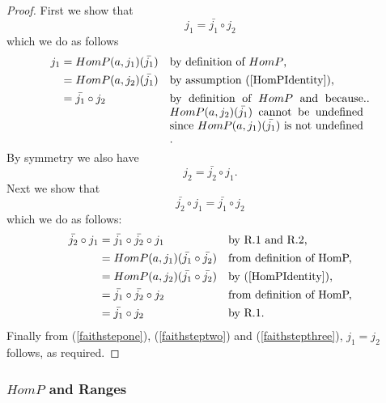 \begin{proof} 
First we show that 
\begin{equation}
\label{faithstepone}
j_1 = \bar{j_1} \circ j_2
\end{equation}
which we do as follows
\begin{align*}
j_1 &= HomP(a,j_1)(\bar{j_1}) &&\mbox{by definition of $HomP$, } \\
   &= HomP(a,j_2)(\bar{j_1}) &&\mbox{by assumption (\ref{HomPIdentity}), } \\
   &= \bar{j_1} \circ j_2    
                     &&\mbox{\parbox[t]{6cm}{by definition 
                                        of $HomP$ and because
                                        $HomP(a,j_2)(\bar{j_1})$ 
                                        cannot be undefined since
                                         $HomP(a,j_1)(\bar{j_1})$
                                         is not undefined . }..} 
  \end{align*}
By symmetry we also have
\begin{equation}
\label{faithsteptwo}
j_2 = \bar{j_2} \circ j_1.
\end{equation}
Next we show that
\begin{equation}
\label{faithstepthree}
\bar{j_2} \circ j_1 = \bar{j_1} \circ j_2
\end{equation}
which we do as follows:
\begin{align*}
\bar{j_2} \circ j_1 
    &= \bar{j_1} \circ \bar{j_2} \circ j_1 &&\mbox{by R.1 and R.2,} \\
    &= HomP(a,j_1)(\bar{j_1} \circ \bar{j_2}) 
                              && \mbox{from definition of HomP,}\\
    &= HomP(a,j_2)(\bar{j_1} \circ \bar{j_2}) 
                              && \mbox{by (\ref{HomPIdentity}),}\\
    &= \bar{j_1} \circ \bar{j_2} \circ j_2 
                              && \mbox{from definition of HomP,}\\
    &= \bar{j_1} \circ j_2    &&\mbox{by R.1.}
\end{align*}
Finally from (\ref{faithstepone}),
(\ref{faithsteptwo}) and (\ref{faithstepthree}),
$j_1=j_2$ follows, as required.
\end{proof}

\subsubsection{$HomP$ and Ranges}

